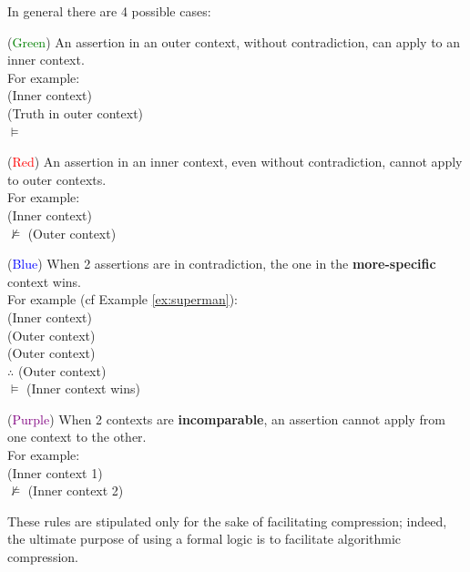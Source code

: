 In general there are 4 possible cases:
\begin{enumerate-}
\item (\textcolor{Green}{Green}) An assertion in an outer context, without contradiction, can apply to an inner context.\\
      For example:\\
        (Inner context)\\
        (Truth in outer context)\\
      $\models$ 
\item (\textcolor{Red}{Red}) An assertion in an inner context, even without contradiction, cannot apply to outer contexts.\\
      For example:\\
        (Inner context)\\
      $\not\models$   (Outer context)
\item (\textcolor{Blue}{Blue}) When 2 assertions are in contradiction, the one in the \textbf{more-specific} context wins.\\
      For example (cf Example \ref{ex:superman}):\\
        (Inner context)\\
        (Outer context)\\
        (Outer context)\\
      $\therefore$   (Outer context)\\
      $\models$  (Inner context wins)
\item (\textcolor{Purple}{Purple}) When 2 contexts are \textbf{incomparable}, an assertion cannot apply from one context to the other.\\
      For example:\\
        (Inner context 1)\\
      $\not\models$   (Inner context 2)
\end{enumerate-}

These rules are stipulated only for the sake of facilitating compression;  indeed, the ultimate purpose of using a formal logic is to facilitate algorithmic compression.

